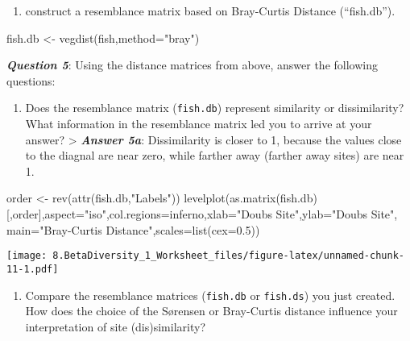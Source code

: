 \documentclass[
]{article}
\newenvironment{Shaded}{\begin{snugshade}}{\end{snugshade}}
\newcommand{\AttributeTok}[1]{\textcolor[rgb]{0.77,0.63,0.00}{#1}}
\newcommand{\FloatTok}[1]{\textcolor[rgb]{0.00,0.00,0.81}{#1}}
\newcommand{\FunctionTok}[1]{\textcolor[rgb]{0.00,0.00,0.00}{#1}}
\newcommand{\NormalTok}[1]{#1}
\newcommand{\OtherTok}[1]{\textcolor[rgb]{0.56,0.35,0.01}{#1}}
\newcommand{\StringTok}[1]{\textcolor[rgb]{0.31,0.60,0.02}{#1}}
\providecommand{\tightlist}{%
  \setlength{\itemsep}{0pt}\setlength{\parskip}{0pt}}
\begin{document}
\begin{enumerate}
\def\labelenumi{\arabic{enumi}.}
\setcounter{enumi}{3}
\tightlist
\item
  construct a resemblance matrix based on Bray-Curtis Distance
  (``fish.db'').
\end{enumerate}

\begin{Shaded}
\begin{Highlighting}[]
\NormalTok{fish.db }\OtherTok{\textless{}{-}} \FunctionTok{vegdist}\NormalTok{(fish,}\AttributeTok{method=}\StringTok{"bray"}\NormalTok{)}
\end{Highlighting}
\end{Shaded}

\textbf{\emph{Question 5}}: Using the distance matrices from above,
answer the following questions:

\begin{enumerate}
\def\labelenumi{\alph{enumi}.}
\tightlist
\item
  Does the resemblance matrix (\texttt{fish.db}) represent similarity or
  dissimilarity? What information in the resemblance matrix led you to
  arrive at your answer? \textgreater{} \textbf{\emph{Answer 5a}}:
  Dissimilarity is closer to 1, because the values close to the diagnal
  are near zero, while farther away (farther away sites) are near 1.
\end{enumerate}

\begin{Shaded}
\begin{Highlighting}[]
\NormalTok{order }\OtherTok{\textless{}{-}} \FunctionTok{rev}\NormalTok{(}\FunctionTok{attr}\NormalTok{(fish.db,}\StringTok{"Labels"}\NormalTok{))}
\FunctionTok{levelplot}\NormalTok{(}\FunctionTok{as.matrix}\NormalTok{(fish.db)[,order],}\AttributeTok{aspect=}\StringTok{"iso"}\NormalTok{,}\AttributeTok{col.regions=}\NormalTok{inferno,}\AttributeTok{xlab=}\StringTok{"Doubs Site"}\NormalTok{,}\AttributeTok{ylab=}\StringTok{"Doubs Site"}\NormalTok{, }\AttributeTok{main=}\StringTok{"Bray{-}Curtis Distance"}\NormalTok{,}\AttributeTok{scales=}\FunctionTok{list}\NormalTok{(}\AttributeTok{cex=}\FloatTok{0.5}\NormalTok{))}
\end{Highlighting}
\end{Shaded}

\texttt{[image: 8.BetaDiversity\_1\_Worksheet\_files/figure-latex/unnamed-chunk-11-1.pdf]}

\begin{enumerate}
\def\labelenumi{\alph{enumi}.}
\setcounter{enumi}{1}
\tightlist
\item
  Compare the resemblance matrices (\texttt{fish.db} or
  \texttt{fish.ds}) you just created. How does the choice of the
  Sørensen or Bray-Curtis distance influence your interpretation of site
  (dis)similarity?
\end{enumerate}
\end{document}
